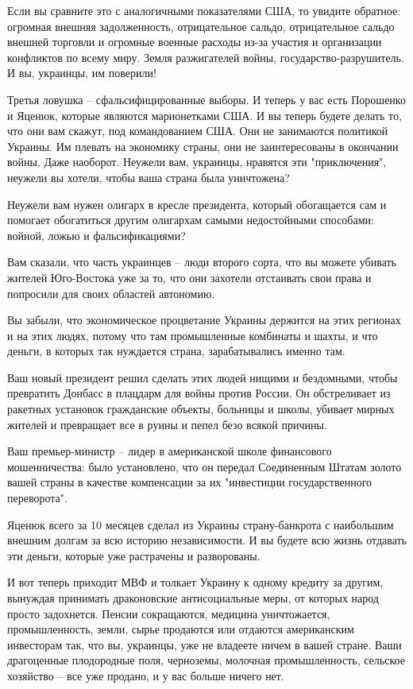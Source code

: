 Если вы сравните это с аналогичными показателями США, то увидите обратное:
огромная внешняя задолженность, отрицательное сальдо, отрицательное сальдо
внешней торговли и огромные военные расходы из-за участия и организации
конфликтов по всему миру. Земля разжигателей войны, государство-разрушитель. И
вы, украинцы, им поверили!

Третья ловушка – сфальсифицированные выборы. И теперь у вас есть Порошенко и
Яценюк, которые являются марионетками США. И вы теперь будете делать то, что
они вам скажут, под командованием США. Они не занимаются политикой Украины. Им
плевать на экономику страны, они не заинтересованы в окончании войны. Даже
наоборот. Неужели вам, украинцы, нравятся эти "приключения", неужели вы хотели,
чтобы ваша страна была уничтожена?

Неужели вам нужен олигарх в кресле президента, который обогащается сам и
помогает обогатиться другим олигархам самыми недостойными способами: войной,
ложью и фальсификациями?

Вам сказали, что часть украинцев – люди второго сорта, что вы можете убивать
жителей Юго-Востока уже за то, что они захотели отстаивать свои права и
попросили для своих областей автономию.

Вы забыли, что экономическое процветание Украины держится на этих регионах и на
этих людях, потому что там промышленные комбинаты и шахты, и что деньги, в
которых так нуждается страна, зарабатывались именно там.

Ваш новый президент решил сделать этих людей нищими и бездомными, чтобы
превратить Донбасс в плацдарм для войны против России. Он обстреливает из
ракетных установок гражданские объекты, больницы и школы, убивает мирных
жителей и превращает все в руины и пепел безо всякой причины.

Ваш премьер-министр – лидер в американской школе финансового мошенничества:
было установлено, что он передал Соединенным Штатам золото вашей страны в
качестве компенсации за их "инвестиции государственного переворота".

Яценюк всего за 10 месяцев сделал из Украины страну-банкрота с наибольшим
внешним долгам за всю историю независимости. И вы будете всю жизнь отдавать эти
деньги, которые уже растрачены и разворованы.

И вот теперь приходит МВФ и толкает Украину к одному кредиту за другим,
вынуждая принимать драконовские антисоциальные меры, от которых народ просто
задохнется. Пенсии сокращаются, медицина уничтожается, промышленность, земли,
сырье продаются или отдаются американским инвесторам так, что вы, украинцы, уже
не владеете ничем в вашей стране. Ваши драгоценные плодородные поля, черноземы,
молочная промышленность, сельское хозяйство – все уже продано, и у вас больше
ничего нет.

